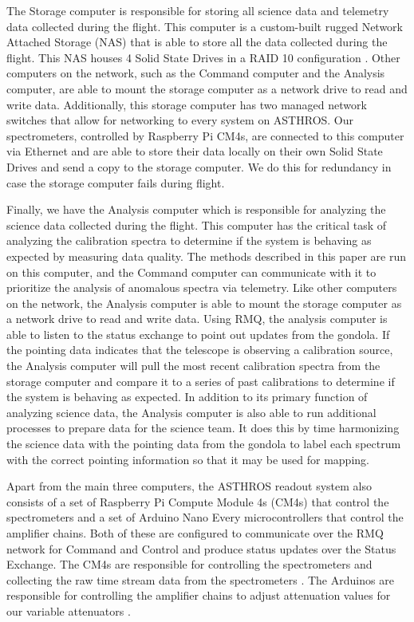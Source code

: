 The Storage computer is responsible for storing all science data and telemetry data collected during the flight.
This computer is a custom-built rugged Network Attached Storage (NAS) that is able to store all the data collected during the flight.
This NAS houses 4 Solid State Drives in a RAID 10 configuration \parencite{chen1994raid}.
Other computers on the network, such as the Command computer and the Analysis computer, are able to mount the storage computer as a network drive to read and write data.
Additionally, this storage computer has two managed network switches that allow for networking to every system on ASTHROS.
Our spectrometers, controlled by Raspberry Pi CM4s, are connected to this computer via Ethernet and are able to store their data locally on their own Solid State Drives and send a copy to the storage computer.
We do this for redundancy in case the storage computer fails during flight.

Finally, we have the Analysis computer which is responsible for analyzing the science data collected during the flight. 
This computer has the critical task of analyzing the calibration spectra to determine if the system is behaving as expected by measuring data quality. 
The methods described in this paper are run on this computer, and the Command computer can communicate with it to prioritize the analysis of anomalous spectra via telemetry.
Like other computers on the network, the Analysis computer is able to mount the storage computer as a network drive to read and write data.
Using RMQ, the analysis computer is able to listen to the status exchange to point out updates from the gondola.
If the pointing data indicates that the telescope is observing a calibration source, the Analysis computer will pull the most recent calibration spectra from the storage computer and compare it to a series of past calibrations to determine if the system is behaving as expected.
In addition to its primary function of analyzing science data, the Analysis computer is also able to run additional processes to prepare data for the science team. 
It does this by time harmonizing the science data with the pointing data from the gondola to label each spectrum with the correct pointing information so that it may be used for mapping. 

Apart from the main three computers, the ASTHROS readout system also consists of a set of Raspberry Pi Compute Module 4s (CM4s) that control the spectrometers and a set of Arduino Nano Every microcontrollers that control the amplifier chains. 
Both of these are configured to communicate over the RMQ network for Command and Control and produce status updates over the Status Exchange. 
The CM4s are responsible for controlling the spectrometers and collecting the raw time stream data from the spectrometers \parencite{mohammed2024digital}.
The Arduinos are responsible for controlling the amplifier chains to adjust attenuation values for our variable attenuators \parencite{Ricardo}.

